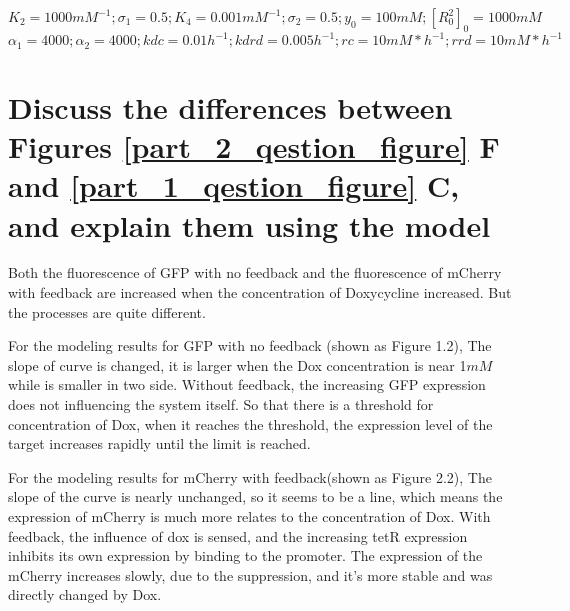 $$K_2 = 1000 mM^{-1}; \sigma_1 = 0.5; K_4 = 0.001 mM^{-1}; \sigma_2 = 0.5;y_0 = 100mM;[R^2_0]_0 = 1000mM$$ 
$$\alpha_1 = 4000 ;\alpha_2 = 4000 ; kdc = 0.01h^{-1} ; kdrd = 0.005h^{-1} ; rc = 10mM*h^{-1} ; rrd = 10mM*h^{-1}$$



\newpage
\section{Discuss the differences between Figures \ref{part_2_qestion_figure} F and \ref{part_1_qestion_figure} C, and explain them using the model}

Both the ﬂuorescence of GFP with no feedback and the ﬂuorescence of mCherry with feedback are increased when the concentration of Doxycycline increased. But the processes are quite different.

For the modeling results for GFP with no feedback (shown as Figure 1.2), The slope of curve is changed, it is larger when the Dox concentration is near 1$mM$ while is smaller in two side. Without feedback, the increasing GFP expression does not inﬂuencing the system itself. So that there is a threshold for concentration of Dox, when it reaches the threshold, the expression level of the target increases rapidly until the limit is reached.

For the modeling results for mCherry with feedback(shown as Figure 2.2), The slope of the curve is nearly unchanged, so it seems to be a line, which means the expression of mCherry is much more relates to the concentration of Dox. With feedback, the inﬂuence of dox is sensed, and the increasing tetR expression inhibits its own expression by binding to the promoter. The expression of the mCherry increases slowly, due to the suppression, and it’s more stable and was directly changed by Dox.



